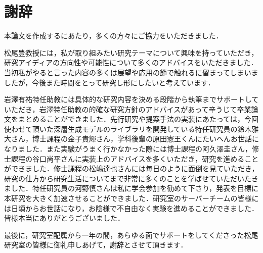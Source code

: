 \chapter*{謝辞}
\label{chap:acknowledgments}
本論文を作成するにあたり，多くの方々にご協力をいただきました．

松尾豊教授には，私が取り組みたい研究テーマについて興味を持っていただき，研究アイディアの方向性や可能性について多くのアドバイスをいただきました．当初私がやると言った内容の多くは展望や応用の節で触れるに留まってしまいましたが，今後また時間をとって研究し形にしたいと考えています．

岩澤有祐特任助教には具体的な研究内容を決める段階から執筆までサポートしていただき，岩澤特任助教の的確な研究方針のアドバイスがあって辛うじて卒業論文をまとめることができました．先行研究や提案手法の実装にあたっては，今回使わせて頂いた深層生成モデルのライブラリを開発している特任研究員の鈴木雅大さん，博士課程の金子貴輝さん，学科後輩の原田憲王くんにたいへんお世話になりました．また実験がうまく行かなかった際には博士課程の阿久澤圭さん，修士課程の谷口尚平さんに実装上のアドバイスを多くいただき，研究を進めることができました．修士課程の松嶋達也さんには毎日のように面倒を見ていただき，研究の仕方から研究生活についてまで非常に多くのことを学ばせていただいたきました．特任研究員の河野慎さんは私に学会参加を勧めて下さり，発表を目標に本研究を大きく加速させることができました．研究室のサーバーチームの皆様には日頃からお世話になり，お陰様で不自由なく実験を進めることができました．皆様本当にありがとうございました．

最後に，研究室配属から一年の間，あらゆる面でサポートをしてくださった松尾研究室の皆様に御礼申しあげて，謝辞とさせて頂きます．